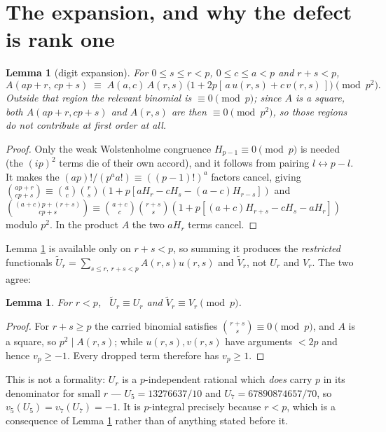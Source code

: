 \documentclass[11pt,a4paper]{amsart}
\theoremstyle{plain}
\newtheorem{lemma}[theorem]{Lemma}
\theoremstyle{definition}
\theoremstyle{remark}
\newcommand{\vp}{v_p}
\newcommand{\A}{A}
\begin{document}
\section{The expansion, and why the defect is rank one}

\begin{lemma}[digit expansion]\label{lem:exp}
For $0\le s\le r<p$, $0\le c\le a<p$ and $r+s<p$,
\[
  \A(ap+r,\,cp+s)\;\equiv\;\A(a,c)\,\A(r,s)\,\bigl(1+2p[\,a\,u(r,s)+c\,v(r,s)\,]\bigr)\pmod{p^2}.
\]
Outside that region the relevant binomial is $\equiv0\pmod p$; since $\A$ is a square,
both $\A(ap+r,cp+s)$ and $\A(r,s)$ are then $\equiv0\pmod{p^2}$, so those regions do not
contribute at first order at all.
\end{lemma}

\begin{proof}
Only the weak Wolstenholme congruence $H_{p-1}\equiv0\pmod p$ is needed (the $(ip)^{2}$
terms die of their own accord), and it follows from pairing $l\leftrightarrow p-l$. It
makes the $(ap)!/(p^aa!)\equiv((p-1)!)^a$ factors cancel, giving
$\binom{ap+r}{cp+s}\equiv\binom ac\binom rs(1+p[aH_r-cH_s-(a-c)H_{r-s}])$ and
$\binom{(a+c)p+(r+s)}{cp+s}\equiv\binom{a+c}c\binom{r+s}s(1+p[(a+c)H_{r+s}-cH_s-aH_r])$
modulo $p^2$. In the product $\A$ the two $aH_r$ terms cancel.
\end{proof}

Lemma \ref{lem:exp} is available only on $r+s<p$, so summing it produces the
\emph{restricted} functionals $\widetilde U_r=\sum_{s\le r,\ r+s<p}\A(r,s)u(r,s)$ and
$\widetilde V_r$, not $U_r$ and $V_r$. The two agree:

\begin{lemma}\label{lem:restrict}
For $r<p$, \ $\widetilde U_r\equiv U_r$ and $\widetilde V_r\equiv V_r \pmod p$.
\end{lemma}

\begin{proof}
For $r+s\ge p$ the carried binomial satisfies $\binom{r+s}s\equiv0\pmod p$, and $\A$ is a
square, so $p^2\mid \A(r,s)$; while $u(r,s),v(r,s)$ have arguments $<2p$ and hence
$\vp\ge-1$. Every dropped term therefore has $\vp\ge1$.
\end{proof}

This is not a formality: $U_r$ is a $p$-independent rational which \emph{does} carry $p$ in
its denominator for small $r$ — $U_5=13276637/10$ and $U_7=67890874657/70$, so
$v_5(U_5)=v_7(U_7)=-1$. It is $p$-integral precisely because $r<p$, which is a consequence
of Lemma \ref{lem:restrict} rather than of anything stated before it.
\end{document}
